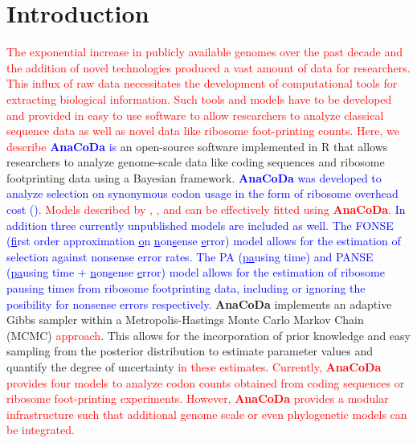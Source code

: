 \documentclass{bioinfo}
\newcommand{\package}{\textbf{AnaCoDa}\xspace} %
\begin{document}
\section*{Introduction}

\textcolor{red}
{
The exponential increase in publicly available genomes over the past decade and the addition of novel technologies produced a vast amount of data for researchers.  
This influx of raw data necessitates the development of computational tools for extracting biological information. 
Such tools and models have to be developed and provided in easy to use software to allow researchers to analyze classical sequence data as well as novel data like ribosome foot-printing counts.
Here, we describe
} %
\textcolor{blue}{\package is}  an open-source software implemented in R \citep{rcore} that allows researchers to analyze genome-scale data like coding sequences and ribosome footprinting data using a Bayesian framework. 
\textcolor{blue}{\package was developed to analyze selection on synonymous codon usage in the form of ribosome overhead cost (\citet{gilchrist2015,wallace2013,shah2011}).} \textcolor{red}{Models described by \citet{gilchrist2015}, \citet{wallace2013}, and \citet{shah2011} can be effectively fitted using \package.}
\textcolor{blue} 
{
In addition three currently unpublished models are included as well. The FONSE (\underline{f}irst order approximation \underline{o}n \underline{n}on\underline{s}ense \underline{e}rror) model allows for the estimation of selection against nonsense error rates.
The PA (\underline{pa}using time) and PANSE (\underline{pa}using time + \underline{n}on\underline{s}ense \underline{e}rror) model allows for the estimation of ribosome pausing times from ribosome footprinting data, including or ignoring the posibility for nonsense errors respectively.
} %
\package implements an adaptive Gibbs sampler within a Metropolis-Hastings Monte Carlo Markov Chain (MCMC) \textcolor{red}{approach}. 
This allows for the incorporation of prior knowledge and easy sampling from the posterior distribution to estimate parameter values and quantify the degree of uncertainty \textcolor{red}{in these estimates}.
\textcolor{red}
{
Currently, \package provides four models to analyze codon counts obtained from coding sequences or ribosome foot-printing experiments. 
However, \package provides a modular infrastructure such that additional genome scale or even phylogenetic models can be integrated.
} 
\end{document}
